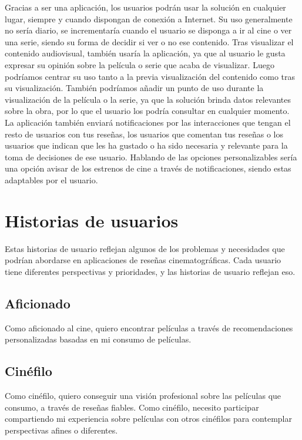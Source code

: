 Gracias a ser una aplicación, los usuarios podrán usar la solución en cualquier lugar, siempre y 
cuando dispongan de conexión a Internet. Su uso generalmente no sería diario, se incrementaría cuando 
el usuario se disponga a ir al cine o ver una serie, siendo su forma de decidir si ver o no ese 
contenido. Tras visualizar el contenido audiovisual, también usaría la aplicación, ya que al usuario le 
gusta expresar su opinión sobre la película o serie que acaba de visualizar. Luego podríamos centrar su 
uso tanto a la previa visualización del contenido como tras su visualización. También podríamos añadir 
un punto de uso durante la visualización de la película o la serie, ya que la solución brinda datos 
relevantes sobre la obra, por lo que el usuario los podría consultar en cualquier momento. La 
aplicación también enviará notificaciones por las interacciones que tengan el resto de usuarios con tus 
reseñas, los usuarios que comentan tus reseñas o los usuarios que indican que les ha gustado o ha sido 
necesaria y relevante para la toma de decisiones de ese usuario. Hablando de las opciones 
personalizables sería una opción avisar de los estrenos de cine a través de notificaciones, 
siendo estas adaptables por el usuario.


\section{Historias de usuarios}

Estas historias de usuario reflejan algunos de los problemas y necesidades que podrían abordarse en aplicaciones de reseñas cinematográficas. Cada usuario tiene diferentes perspectivas y prioridades, y las historias de usuario reflejan eso.

\subsection{Aficionado}

Como aficionado al cine, quiero encontrar películas a través de recomendaciones personalizadas basadas en mi consumo de películas.

\subsection{Cinéfilo}

Como cinéfilo, quiero conseguir una visión profesional sobre las películas que consumo, a través de reseñas fiables. Como cinéfilo, necesito participar compartiendo mi experiencia sobre películas con otros cinéfilos para contemplar perspectivas afines o diferentes. 

